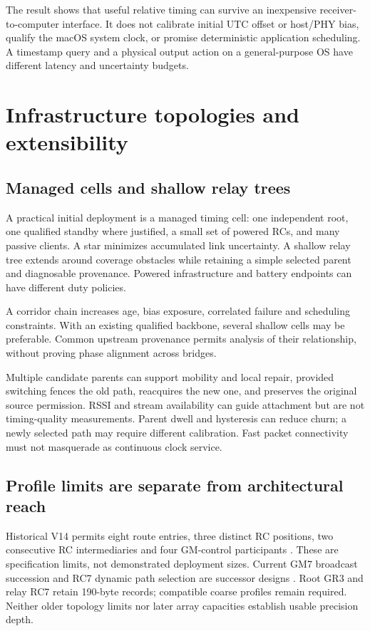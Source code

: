 \documentclass[11pt,letterpaper]{article}
\begin{document}
The result shows that useful relative timing can survive an inexpensive receiver-to-computer interface. It does not calibrate initial UTC offset or host/PHY bias, qualify the macOS system clock, or promise deterministic application scheduling. A timestamp query and a physical output action on a general-purpose OS have different latency and uncertainty budgets.

\section{Infrastructure topologies and extensibility}
\subsection{Managed cells and shallow relay trees}
A practical initial deployment is a managed timing cell: one independent root, one qualified standby where justified, a small set of powered RCs, and many passive clients. A star minimizes accumulated link uncertainty. A shallow relay tree extends around coverage obstacles while retaining a simple selected parent and diagnosable provenance. Powered infrastructure and battery endpoints can have different duty policies.

A corridor chain increases age, bias exposure, correlated failure and scheduling constraints. With an existing qualified backbone, several shallow cells may be preferable. Common upstream provenance permits analysis of their relationship, without proving phase alignment across bridges.

Multiple candidate parents can support mobility and local repair, provided switching fences the old path, reacquires the new one, and preserves the original source permission. RSSI and stream availability can guide attachment but are not timing-quality measurements. Parent dwell and hysteresis can reduce churn; a newly selected path may require different calibration. Fast packet connectivity must not masquerade as continuous clock service.

\subsection{Profile limits are separate from architectural reach}
Historical V14 permits eight route entries, three distinct RC positions, two consecutive RC intermediaries and four GM-control participants \cite{v14}. These are specification limits, not demonstrated deployment sizes. Current GM7 broadcast succession and RC7 dynamic path selection are successor designs \cite{current}. Root GR3 and relay RC7 retain 190-byte records; compatible coarse profiles remain required. Neither older topology limits nor later array capacities establish usable precision depth.
\end{document}
